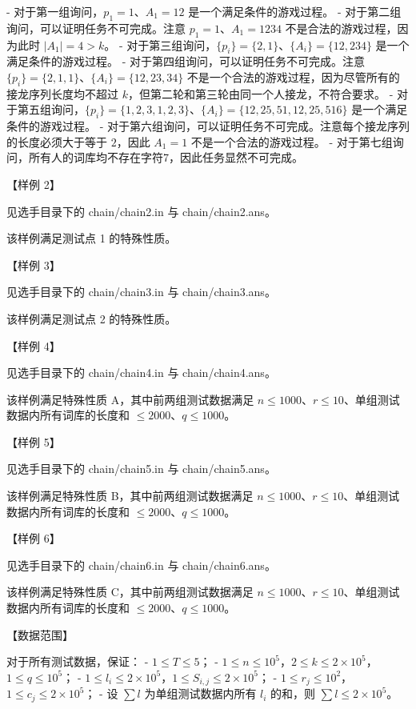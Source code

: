 \documentclass[12pt,twiside,a4paper]{ctexbook}
\numberwithin{chapter}{part}
\begin{document}
- 对于第一组询问，$p_1 = 1$、$A_1 = 12$ 是一个满足条件的游戏过程。
- 对于第二组询问，可以证明任务不可完成。注意 $p_1 = 1$、$A_1 = 1234$ 不是合法的游戏过程，因为此时 $|A_1| = 4 > k$。
- 对于第三组询问，$\{p_i\} = \{2, 1\}$、$\{A_i\} = \{12, 234\}$ 是一个满足条件的游戏过程。
- 对于第四组询问，可以证明任务不可完成。注意 $\{p_i\} = \{2, 1, 1\}、\{A_i\} = \{12, 23, 34\}$ 不是一个合法的游戏过程，因为尽管所有的接龙序列长度均不超过 $k$，但第二轮和第三轮由同一个人接龙，不符合要求。
- 对于第五组询问，$\{p_i\} = \{1, 2, 3, 1, 2, 3\}$、$\{A_i\} = \{12, 25, 51, 12, 25, 516\}$ 是一个满足条件的游戏过程。
-  对于第六组询问，可以证明任务不可完成。注意每个接龙序列的长度必须大于等于 $2$，因此 $A_1 = 1$ 不是一个合法的游戏过程。
- 对于第七组询问，所有人的词库均不存在字符7，因此任务显然不可完成。

【样例 2】

见选手目录下的 chain/chain2.in 与 chain/chain2.ans。

该样例满足测试点 1 的特殊性质。

【样例 3】

见选手目录下的 chain/chain3.in 与 chain/chain3.ans。

该样例满足测试点 2 的特殊性质。

【样例 4】

见选手目录下的 chain/chain4.in 与 chain/chain4.ans。

该样例满足特殊性质 A，其中前两组测试数据满足 $n \leq 1000$、$r \leq 10$、单组测试数据内所有词库的长度和 $\leq 2000$、$q \leq 1000$。

【样例 5】

见选手目录下的 chain/chain5.in 与 chain/chain5.ans。

该样例满足特殊性质 B，其中前两组测试数据满足 $n \leq 1000$、$r \leq 10$、单组测试数据内所有词库的长度和 $\leq 2000$、$q \leq 1000$。

【样例 6】

见选手目录下的 chain/chain6.in 与 chain/chain6.ans。

该样例满足特殊性质 C，其中前两组测试数据满足 $n \leq 1000$、$r \leq 10$、单组测试数据内所有词库的长度和 $\leq 2000$、$q \leq 1000$。

【数据范围】

对于所有测试数据，保证：
- $1 \leq T \leq 5$；
- $1 \leq n \leq 10^5$，$2 \leq k \leq 2 \times 10^5$，$1 \leq q \leq 10^5$；
- $1 \leq l_i \leq 2 \times 10^5$，$1 \leq S_{i,j} \leq 2 \times 10^5$；
- $1 \leq r_j \leq 10^2$，$1 \leq c_j \leq 2 \times 10^5$；
- 设 $\sum l$ 为单组测试数据内所有 $l_i$ 的和，则 $\sum l\leq 2\times 10^5$。
\end{document}
